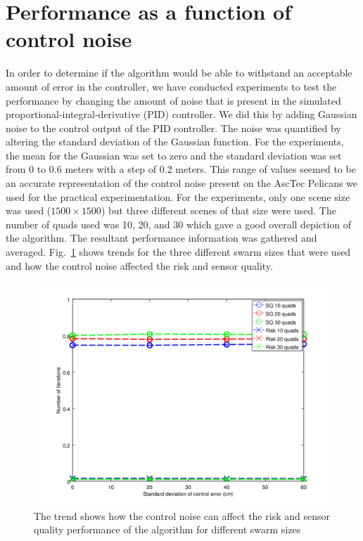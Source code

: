 \documentclass{article}
\begin{document}
\section{Performance as a function of control noise}

In order to determine if the algorithm would be able to withstand an acceptable
amount of error in the controller, we have conducted experiments to test the
performance by changing the amount of noise that is present in the simulated
proportional-integral-derivative (PID) controller. We did this by adding
Gaussian noise to the control output of the PID controller. The noise was
quantified by altering the standard deviation of the Gaussian function. For the
experiments, the mean for the Gaussian was set to zero and the standard
deviation was set from 0 to 0.6 meters with a step of 0.2 meters. This range of
values seemed to be an accurate representation of the control noise present on
the AscTec Pelicans we used for the practical experimentation. For the
experiments, only one scene size was used ($1500 \times 1500$) but three
different scenes of that size were used. The number of quads used was 10, 20,
and 30 which gave a good overall depiction of the algorithm. The resultant
performance information was gathered and averaged. Fig.~\ref{fig:res_cn_r_sq}
shows trends for the three different swarm sizes that were used and how the
control noise affected the risk and sensor quality.

\begin{figure}[h!]

    \includegraphics[width=1\columnwidth]{tasefigs/cn_sq_risk.png}

    \caption{The trend shows how the control noise can affect the risk and
        sensor quality performance of the algorithm for different swarm sizes}

    \label{fig:res_cn_r_sq}

\end{figure}
\end{document}
